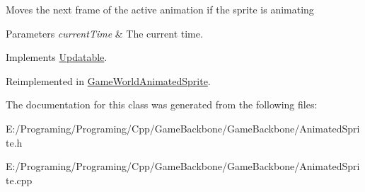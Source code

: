 Moves the next frame of the active animation if the sprite is animating 


\begin{DoxyParams}{Parameters}
{\em current\+Time} & The current time.\\
\hline
\end{DoxyParams}


Implements \hyperlink{class_updatable}{Updatable}.



Reimplemented in \hyperlink{class_game_world_animated_sprite_a6fab62c5ed11541027a88c695a8b6147}{Game\+World\+Animated\+Sprite}.



The documentation for this class was generated from the following files\+:\begin{DoxyCompactItemize}
\item 
E\+:/\+Programing/\+Programing/\+Cpp/\+Game\+Backbone/\+Game\+Backbone/Animated\+Sprite.\+h\item 
E\+:/\+Programing/\+Programing/\+Cpp/\+Game\+Backbone/\+Game\+Backbone/Animated\+Sprite.\+cpp\end{DoxyCompactItemize}

